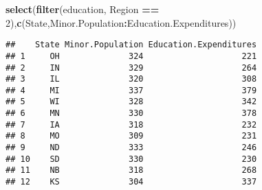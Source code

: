 \documentclass[]{book}
\newenvironment{Shaded}{\begin{snugshade}}{\end{snugshade}}
\newcommand{\DecValTok}[1]{\textcolor[rgb]{0.00,0.00,0.81}{#1}}
\newcommand{\KeywordTok}[1]{\textcolor[rgb]{0.13,0.29,0.53}{\textbf{#1}}}
\newcommand{\NormalTok}[1]{#1}
\newcommand{\OperatorTok}[1]{\textcolor[rgb]{0.81,0.36,0.00}{\textbf{#1}}}
\newcommand{\StringTok}[1]{\textcolor[rgb]{0.31,0.60,0.02}{#1}}
\begin{document}
\begin{Shaded}
\begin{Highlighting}[]
\KeywordTok{select}\NormalTok{(}\KeywordTok{filter}\NormalTok{(education, Region }\OperatorTok{==}\StringTok{ }\DecValTok{2}\NormalTok{),}\KeywordTok{c}\NormalTok{(State,Minor.Population}\OperatorTok{:}\NormalTok{Education.Expenditures))}
\end{Highlighting}
\end{Shaded}

\begin{verbatim}
##    State Minor.Population Education.Expenditures
## 1     OH              324                    221
## 2     IN              329                    264
## 3     IL              320                    308
## 4     MI              337                    379
## 5     WI              328                    342
## 6     MN              330                    378
## 7     IA              318                    232
## 8     MO              309                    231
## 9     ND              333                    246
## 10    SD              330                    230
## 11    NB              318                    268
## 12    KS              304                    337
\end{verbatim}


\end{document}
